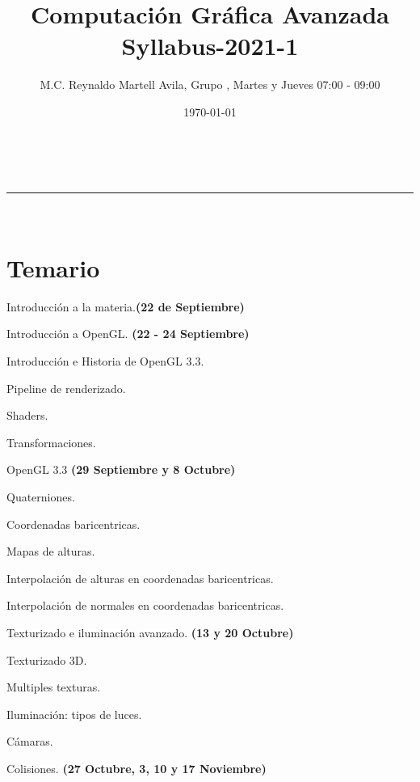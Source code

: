 \documentclass[a4paper,11pt]{article}
\makeatletter
\newcommand{\linia}{\rule{\linewidth}{0.5pt}}
\theoremstyle{mytheor}
\renewcommand{\maketitle}{
\begin{center}
\vspace{2ex}
{\huge \textsc{\@title}}
\vspace{1ex}
\\
\linia\\
\@author \hfill \@date
\vspace{4ex}
\end{center}
}
\makeatother
\begin{document}
\title{Computación Gráfica Avanzada \\ Syllabus-2021-1}

\author{M.C. Reynaldo Martell Avila, Grupo  , Martes y Jueves 07:00 - 09:00}

\date{\today}

\maketitle

\section*{Temario}

Introducción a la materia.\textbf{(22 de Septiembre)}
\begin{legal}
	\item Introducción a OpenGL. \textbf{(22 - 24 Septiembre)}
	\begin{legal}
		\item Introducción e Historia de OpenGL 3.3.
		\item Pipeline de renderizado.
		\item Shaders.
		\item Transformaciones.
	\end{legal}
	\item OpenGL 3.3 \textbf{(29 Septiembre y 8 Octubre)}
	\begin{legal}
		\item Quaterniones.
		\item Coordenadas baricentricas.
		\item Mapas de alturas.
		\item Interpolación de alturas en coordenadas baricentricas.
		\item Interpolación de normales en coordenadas baricentricas.
	\end{legal}
	\item Texturizado e iluminación avanzado. \textbf{(13 y 20 Octubre)}
	\begin{legal}
		\item Texturizado 3D.
		\item Multiples texturas.
		\item Iluminación: tipos de luces.
		\item Cámaras.
	\end{legal}
	\item Colisiones. \textbf{(27 Octubre, 3, 10 y 17 Noviembre)}
	\begin{legal}

\end{legal}
\end{legal}
\end{document}

